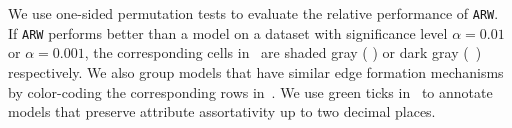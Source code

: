 
We use one-sided permutation tests \cite{good2013permutation} to evaluate the relative
performance of \texttt{ARW}. If \texttt{ARW} performs better than a model on a dataset
with significance level $\alpha=0.01$ or $\alpha=0.001$, the corresponding cells in~
are shaded gray ( \lightgraybg{ }) or dark gray (~\darkgraybg{ }) respectively.
We also group models that have similar edge formation mechanisms by color-coding the
corresponding rows in~.  We use green ticks in~ to
annotate models that preserve attribute assortativity up to two decimal places.



